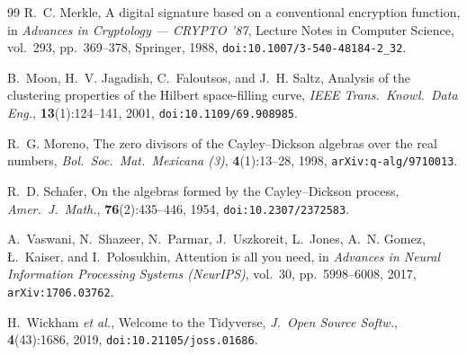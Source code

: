 \documentclass[11pt]{article}
\theoremstyle{plain}
\theoremstyle{definition}
\begin{document}
\begin{thebibliography}{99}
R.~C. Merkle,
A digital signature based on a conventional encryption function,
in \emph{Advances in Cryptology --- CRYPTO '87}, Lecture Notes in Computer Science, vol.~293, pp.~369--378, Springer, 1988, \texttt{doi:10.1007/3-540-48184-2\_32}.

B.~Moon, H.~V. Jagadish, C.~Faloutsos, and J.~H. Saltz,
Analysis of the clustering properties of the Hilbert space-filling curve,
\emph{IEEE Trans.\ Knowl.\ Data Eng.}, \textbf{13}(1):124--141, 2001, \texttt{doi:10.1109/69.908985}.

R.~G. Moreno,
The zero divisors of the Cayley--Dickson algebras over the real numbers,
\emph{Bol.\ Soc.\ Mat.\ Mexicana (3)}, \textbf{4}(1):13--28, 1998, \texttt{arXiv:q-alg/9710013}.

R.~D. Schafer,
On the algebras formed by the Cayley--Dickson process,
\emph{Amer.\ J.\ Math.}, \textbf{76}(2):435--446, 1954, \texttt{doi:10.2307/2372583}.

A.~Vaswani, N.~Shazeer, N.~Parmar, J.~Uszkoreit, L.~Jones, A.~N. Gomez, \L.~Kaiser, and I.~Polosukhin,
Attention is all you need,
in \emph{Advances in Neural Information Processing Systems (NeurIPS)}, vol.~30, pp.~5998--6008, 2017, \texttt{arXiv:1706.03762}.

H.~Wickham \emph{et al.},
Welcome to the Tidyverse,
\emph{J.\ Open Source Softw.}, \textbf{4}(43):1686, 2019, \texttt{doi:10.21105/joss.01686}.

\end{thebibliography}
\end{document}
